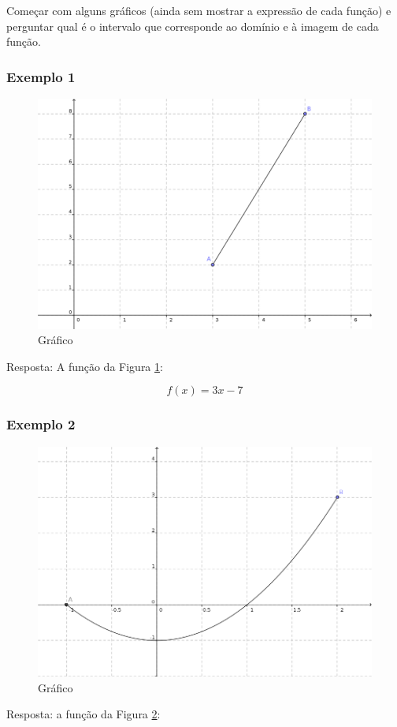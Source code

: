 \documentclass[a4paper]{article}
\begin{document}
Começar com alguns gráficos (ainda sem mostrar a expressão de cada função) e perguntar qual é o intervalo que corresponde ao domínio e à imagem de cada função.

\subsubsection{Exemplo 1}

\begin{figure}[h!]
  \centering
  \includegraphics[width=.6\textwidth]{1reta} 
  \caption{Gráfico}
  \label{fig:1reta}
\end{figure}

Resposta: A função da Figura \ref{fig:1reta}:

\begin{displaymath}
  f(x) = 3x-7
\end{displaymath}


\subsubsection{Exemplo 2}

\begin{figure}[h!]
  \centering
  \includegraphics[width=.6\textwidth]{parabola} 
  \caption{Gráfico}
  \label{fig:parabola}
\end{figure}

Resposta: a função da Figura \ref{fig:parabola}:
\end{document}

